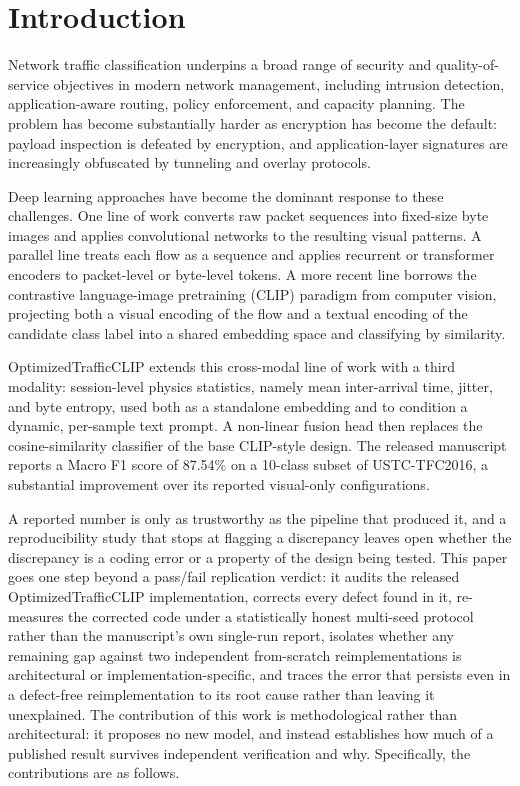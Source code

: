 \documentclass[journal]{IEEEtran}
\begin{document}
\section{Introduction}

Network traffic classification underpins a broad range of security and quality-of-service objectives in modern network management, including intrusion detection, application-aware routing, policy enforcement, and capacity planning. The problem has become substantially harder as encryption has become the default: payload inspection is defeated by encryption, and application-layer signatures are increasingly obfuscated by tunneling and overlay protocols.

Deep learning approaches have become the dominant response to these challenges. One line of work converts raw packet sequences into fixed-size byte images and applies convolutional networks to the resulting visual patterns. A parallel line treats each flow as a sequence and applies recurrent or transformer encoders to packet-level or byte-level tokens. A more recent line borrows the contrastive language-image pretraining (CLIP) paradigm from computer vision, projecting both a visual encoding of the flow and a textual encoding of the candidate class label into a shared embedding space and classifying by similarity.

OptimizedTrafficCLIP \cite{de2026otc} extends this cross-modal line of work with a third modality: session-level physics statistics, namely mean inter-arrival time, jitter, and byte entropy, used both as a standalone embedding and to condition a dynamic, per-sample text prompt. A non-linear fusion head then replaces the cosine-similarity classifier of the base CLIP-style design. The released manuscript reports a Macro F1 score of 87.54\% on a 10-class subset of USTC-TFC2016, a substantial improvement over its reported visual-only configurations.

A reported number is only as trustworthy as the pipeline that produced it, and a reproducibility study that stops at flagging a discrepancy leaves open whether the discrepancy is a coding error or a property of the design being tested. This paper goes one step beyond a pass/fail replication verdict: it audits the released OptimizedTrafficCLIP implementation, corrects every defect found in it, re-measures the corrected code under a statistically honest multi-seed protocol rather than the manuscript's own single-run report, isolates whether any remaining gap against two independent from-scratch reimplementations is architectural or implementation-specific, and traces the error that persists even in a defect-free reimplementation to its root cause rather than leaving it unexplained. The contribution of this work is methodological rather than architectural: it proposes no new model, and instead establishes how much of a published result survives independent verification and why. Specifically, the contributions are as follows.
\end{document}
